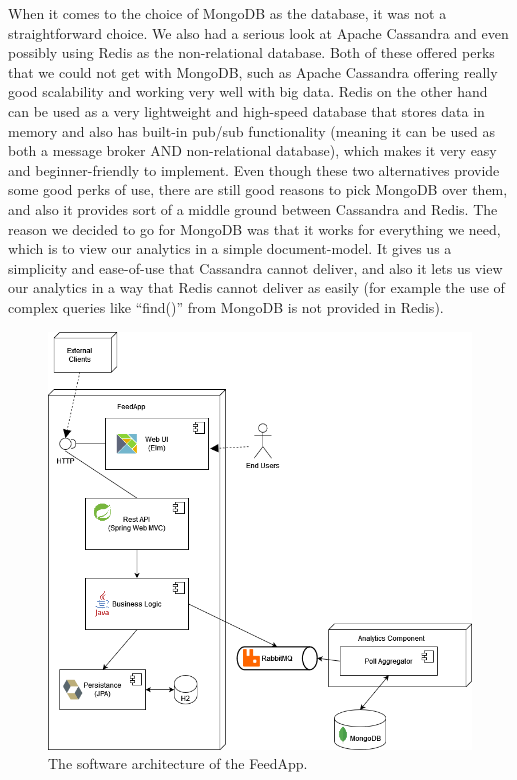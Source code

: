 When it comes to the choice of MongoDB as the database, it was not a straightforward choice. We also had a serious look at Apache Cassandra and even possibly using Redis as the non-relational database. Both of these offered perks that we could not get with MongoDB, such as Apache Cassandra offering really good scalability and working very well with big data. Redis on the other hand can be used as a very lightweight and high-speed database that stores data in memory and also has built-in pub/sub functionality (meaning it can be used as both a message broker AND non-relational database), which makes it very easy and beginner-friendly to implement. Even though these two alternatives provide some good perks of use, there are still good reasons to pick MongoDB over them, and also it provides sort of a middle ground between Cassandra and Redis. The reason we decided to go for MongoDB was that it works for everything we need, which is to view our analytics in a simple document-model. It gives us a simplicity and ease-of-use that Cassandra cannot deliver, and also it lets us view our analytics in a way that Redis cannot deliver as easily (for example the use of complex queries like “find()” from MongoDB is not provided in Redis).

\begin{figure}[thb]
	\centering
	\includegraphics[scale=0.5]{figs/DAT250architecture.png}
	\caption{The software architecture of the FeedApp.}
	\label{fig:DAT250architecture}
\end{figure}
